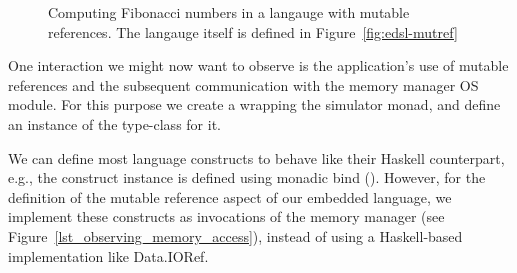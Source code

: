 \begin{figure}
\caption{Computing Fibonacci numbers in a langauge with mutable
  references. The langauge itself is defined in Figure~\ref{fig:edsl-mutref}}
\label{fig:edsl-fib}
\end{figure}

One interaction we might now want to observe is the application's use of mutable references and the subsequent communication with the memory manager OS module.
For this purpose we create a  wrapping the simulator monad, and define an instance of the  type-class for it.

We can define most language constructs to behave like their Haskell counterpart, e.g., the  construct instance is defined using monadic bind (\hs{>>=}\xspace).
However, for the definition of the mutable reference aspect of our embedded language, we implement these constructs as invocations of the memory manager (see Figure~\ref{lst_observing_memory_access}),
instead of using a Haskell-based implementation like \textsf{Data.IORef}.






